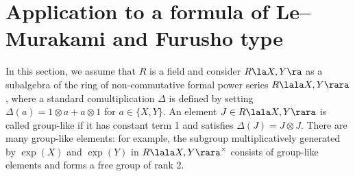 \section{Application to a formula of Le--Murakami and Furusho type}

In this section, we assume that $R$ is a field and consider 
$R\la X,Y\ra$ as a subalgebra of the ring of non-commutative
formal power series $R\lala X,Y\rara$, where a standard
comultiplication $\Delta$ is defined by setting
$\Delta(a)=1\otimes a+a\otimes 1$ for $a\in\{X,Y\}$.  
An element $J\in R\lala X,Y\rara$ is called group-like if
it has constant term 1 and satisfies $\Delta(J)=J\otimes J$. 
There are many group-like elements: 
for example, the subgroup multiplicatively generated by $\exp(X)$ and $\exp(Y)$
in $R\lala X,Y\rara^\times$ consists of group-like elements and forms a free group of rank 2. 
